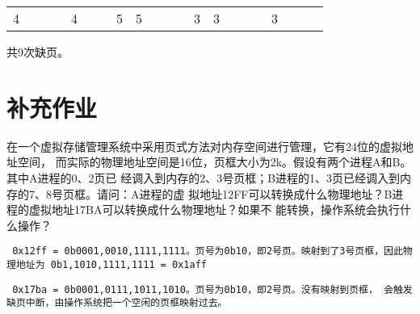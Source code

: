 \documentclass{ctexart}
\begin{document}
\begin{outline}[enumerate]
\begin{table}[H]
\begin{tabular}{c|c|c|c|c|c|c|c|c|c|c|c|c|c|c|c|c|c|c|c|c|}
    \cline{2-21}
    4                                       &                       &                       &                       & 4                     &                       &                       & 5                     & 5                     &                       &                       &                       & 3                     & 3                     &                       &                       &                       & 3                     &                       &                     &  \\
    \cline{2-21}
    \end{tabular}
    \end{table}
    共9次缺页。
\end{outline}
\section*{补充作业}
\begin{outline}[enumerate]
    \1 在一个虚拟存储管理系统中采用页式方法对内存空间进行管理，它有24位的虚拟地址空间，
    而实际的物理地址空间是16位，页框大小为2k。假设有两个进程A和B。其中A进程的0、2页已
    经调入到内存的2、3号页框；B进程的1、3页已经调入到内存的7、8号页框。请问：A进程的虚
    拟地址12FF可以转换成什么物理地址？B进程的虚拟地址17BA可以转换成什么物理地址？如果不
    能转换，操作系统会执行什么操作？

    \texttt{
        0x12ff = 0b0001,0010,1111,1111。页号为0b10，即2号页。映射到了3号页框，因此物理地址为
        0b1,1010,1111,1111 = 0x1aff
    }

    \texttt{
        0x17ba = 0b0001,0111,1011,1010。页号为0b10，即2号页。没有映射到页框，
        会触发缺页中断，由操作系统把一个空闲的页框映射过去。
    }

\end{outline}
\end{document}
